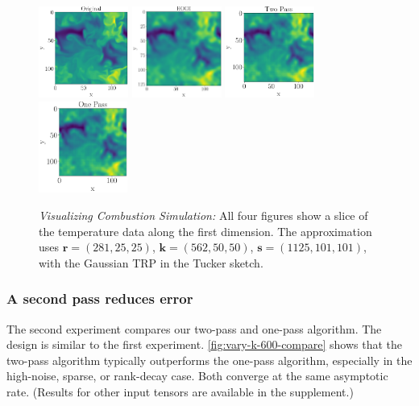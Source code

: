 \begin{figure}[h!]
	\includegraphics[height=3cm]{figure/T100_original.pdf}
	\includegraphics[height=3cm]{figure/T100_hooi.pdf}
	\includegraphics[height=3cm]{figure/T100_2pass.pdf}
	\includegraphics[height=3cm]{figure/T100_1pass.pdf}
	\centering
	\caption{\label{fig:T100}\textit{Visualizing Combustion Simulation:}
	All four figures show a slice of the temperature data along the first dimension.
	The approximation uses
	$\mathbf{r} = (281,25,25)$,
	$\mathbf{k} = (562,50,50)$,
	$\mathbf{s} = (1125, 101, 101)$,
	with the Gaussian TRP in the Tucker sketch.}
\end{figure}

\subsubsection{A second pass reduces error}
The second experiment compares our two-pass and one-pass algorithm.
The design is similar to the first experiment.
\ref{fig:vary-k-600-compare} shows that the two-pass algorithm
typically outperforms the one-pass algorithm,
especially in the high-noise, sparse, or rank-decay case.
Both converge at the same asymptotic rate.
(Results for other input tensors are available
in the supplement.)

